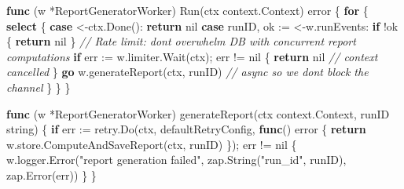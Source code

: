 \documentclass[
]{article}
\newenvironment{Shaded}{}{}
\newcommand{\CommentTok}[1]{\textcolor[rgb]{0.38,0.63,0.69}{\textit{#1}}}
\newcommand{\ControlFlowTok}[1]{\textcolor[rgb]{0.00,0.44,0.13}{\textbf{#1}}}
\newcommand{\DataTypeTok}[1]{\textcolor[rgb]{0.56,0.13,0.00}{#1}}
\newcommand{\KeywordTok}[1]{\textcolor[rgb]{0.00,0.44,0.13}{\textbf{#1}}}
\newcommand{\NormalTok}[1]{#1}
\newcommand{\OperatorTok}[1]{\textcolor[rgb]{0.40,0.40,0.40}{#1}}
\newcommand{\OtherTok}[1]{\textcolor[rgb]{0.00,0.44,0.13}{#1}}
\newcommand{\StringTok}[1]{\textcolor[rgb]{0.25,0.44,0.63}{#1}}
\begin{document}
\begin{Shaded}
\begin{Highlighting}[]
\KeywordTok{func} \OperatorTok{(}\NormalTok{w }\OperatorTok{*}\NormalTok{ReportGeneratorWorker}\OperatorTok{)}\NormalTok{ Run}\OperatorTok{(}\NormalTok{ctx context}\OperatorTok{.}\NormalTok{Context}\OperatorTok{)} \DataTypeTok{error} \OperatorTok{\{}
    \ControlFlowTok{for} \OperatorTok{\{}
        \ControlFlowTok{select} \OperatorTok{\{}
        \ControlFlowTok{case} \OperatorTok{\textless{}{-}}\NormalTok{ctx}\OperatorTok{.}\NormalTok{Done}\OperatorTok{():}
            \ControlFlowTok{return} \OtherTok{nil}
        \ControlFlowTok{case}\NormalTok{ runID}\OperatorTok{,}\NormalTok{ ok }\OperatorTok{:=} \OperatorTok{\textless{}{-}}\NormalTok{w}\OperatorTok{.}\NormalTok{runEvents}\OperatorTok{:}
            \ControlFlowTok{if} \OperatorTok{!}\NormalTok{ok }\OperatorTok{\{}
                \ControlFlowTok{return} \OtherTok{nil}
            \OperatorTok{\}}
            \CommentTok{// Rate limit: don\textquotesingle{}t overwhelm DB with concurrent report computations}
            \ControlFlowTok{if}\NormalTok{ err }\OperatorTok{:=}\NormalTok{ w}\OperatorTok{.}\NormalTok{limiter}\OperatorTok{.}\NormalTok{Wait}\OperatorTok{(}\NormalTok{ctx}\OperatorTok{);}\NormalTok{ err }\OperatorTok{!=} \OtherTok{nil} \OperatorTok{\{}
                \ControlFlowTok{return} \OtherTok{nil} \CommentTok{// context cancelled}
            \OperatorTok{\}}
            \ControlFlowTok{go}\NormalTok{ w}\OperatorTok{.}\NormalTok{generateReport}\OperatorTok{(}\NormalTok{ctx}\OperatorTok{,}\NormalTok{ runID}\OperatorTok{)} \CommentTok{// async so we don\textquotesingle{}t block the channel}
        \OperatorTok{\}}
    \OperatorTok{\}}
\OperatorTok{\}}

\KeywordTok{func} \OperatorTok{(}\NormalTok{w }\OperatorTok{*}\NormalTok{ReportGeneratorWorker}\OperatorTok{)}\NormalTok{ generateReport}\OperatorTok{(}\NormalTok{ctx context}\OperatorTok{.}\NormalTok{Context}\OperatorTok{,}\NormalTok{ runID }\DataTypeTok{string}\OperatorTok{)} \OperatorTok{\{}
    \ControlFlowTok{if}\NormalTok{ err }\OperatorTok{:=}\NormalTok{ retry}\OperatorTok{.}\NormalTok{Do}\OperatorTok{(}\NormalTok{ctx}\OperatorTok{,}\NormalTok{ defaultRetryConfig}\OperatorTok{,} \KeywordTok{func}\OperatorTok{()} \DataTypeTok{error} \OperatorTok{\{}
        \ControlFlowTok{return}\NormalTok{ w}\OperatorTok{.}\NormalTok{store}\OperatorTok{.}\NormalTok{ComputeAndSaveReport}\OperatorTok{(}\NormalTok{ctx}\OperatorTok{,}\NormalTok{ runID}\OperatorTok{)}
    \OperatorTok{\});}\NormalTok{ err }\OperatorTok{!=} \OtherTok{nil} \OperatorTok{\{}
\NormalTok{        w}\OperatorTok{.}\NormalTok{logger}\OperatorTok{.}\NormalTok{Error}\OperatorTok{(}\StringTok{"report generation failed"}\OperatorTok{,}\NormalTok{ zap}\OperatorTok{.}\NormalTok{String}\OperatorTok{(}\StringTok{"run\_id"}\OperatorTok{,}\NormalTok{ runID}\OperatorTok{),}\NormalTok{ zap}\OperatorTok{.}\NormalTok{Error}\OperatorTok{(}\NormalTok{err}\OperatorTok{))}
    \OperatorTok{\}}
\OperatorTok{\}}
\end{Highlighting}
\end{Shaded}
\end{document}
